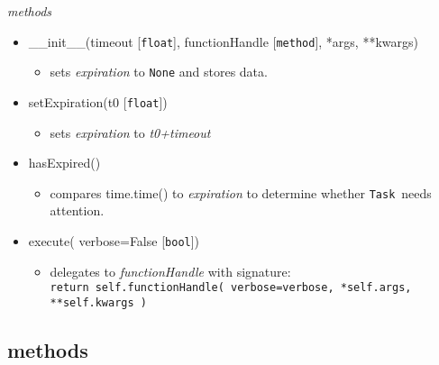 \documentclass{article}
\newcommand{\Task}{\texttt{Task}}
\newcommand{\pythonfloat}{\texttt{float}}
\newcommand{\pythonbool}{\texttt{bool}}
\begin{document}
\noindent
\textit{methods}

\begin{itemize}
    \item{\_\_init\_\_(timeout [\pythonfloat], functionHandle [\texttt{method}], *args, **kwargs)
        \begin{itemize}
            \item{sets \textit{expiration} to \texttt{None} and stores data.}
        \end{itemize}
         }
    \item{setExpiration(t0 [\pythonfloat])
        \begin{itemize}
            \item{sets \textit{expiration} to \textit{t0+timeout}}
        \end{itemize}
         }
    \item{hasExpired()
        \begin{itemize}
            \item{compares time.time() to \textit{expiration} to determine whether \Task~needs attention.}
        \end{itemize}
         }
    \item{execute( verbose=False [\pythonbool])
        \begin{itemize}
            \item{delegates to \textit{functionHandle} with signature: \\ \texttt{return self.functionHandle( verbose=verbose, *self.args, **self.kwargs )}}
        \end{itemize}
         }
\end{itemize}


\subsection{methods}
\label{sec: methods}
\end{document}
